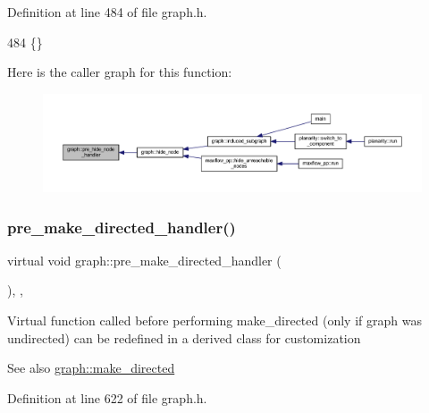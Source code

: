 Definition at line 484 of file graph.\+h.


\begin{DoxyCode}
484 \{\}          
\end{DoxyCode}
Here is the caller graph for this function\+:
\nopagebreak
\begin{figure}[H]
\begin{center}
\leavevmode
\includegraphics[width=350pt]{classgraph_ac169b1dca0b01c97e683302b3908fd49_icgraph}
\end{center}
\end{figure}
\mbox{\label{classgraph_a505198f412b1e426e9d09b62ea9811e8}} 
\subsubsection{\texorpdfstring{pre\+\_\+make\+\_\+directed\+\_\+handler()}{pre\_make\_directed\_handler()}}
{\footnotesize\ttfamily virtual void graph\+::pre\+\_\+make\+\_\+directed\+\_\+handler (\begin{DoxyParamCaption}{ }\end{DoxyParamCaption})\hspace{0.3cm}{\ttfamily [inline]}, {\ttfamily [virtual]}, {\ttfamily [inherited]}}

Virtual function called before performing make\+\_\+directed (only if graph was undirected) can be redefined in a derived class for customization

\begin{DoxySeeAlso}{See also}
\mbox{\hyperlink{classgraph_a1615678dee6248d6d8a00c553770b3bd}{graph\+::make\+\_\+directed}} 
\end{DoxySeeAlso}


Definition at line 622 of file graph.\+h.


